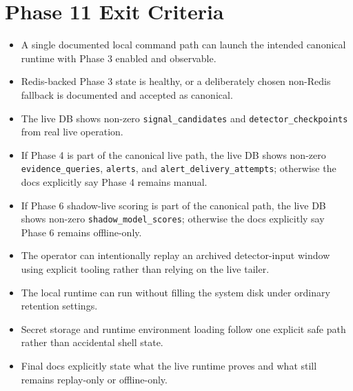\documentclass{article}
\begin{document}
\section*{Phase 11 Exit Criteria}
\begin{itemize}
\item A single documented local command path can launch the intended canonical runtime with Phase 3 enabled and observable.
\item Redis-backed Phase 3 state is healthy, or a deliberately chosen non-Redis fallback is documented and accepted as canonical.
\item The live DB shows non-zero \texttt{signal\_candidates} and \texttt{detector\_checkpoints} from real live operation.
\item If Phase 4 is part of the canonical live path, the live DB shows non-zero \texttt{evidence\_queries}, \texttt{alerts}, and \texttt{alert\_delivery\_attempts}; otherwise the docs explicitly say Phase 4 remains manual.
\item If Phase 6 shadow-live scoring is part of the canonical path, the live DB shows non-zero \texttt{shadow\_model\_scores}; otherwise the docs explicitly say Phase 6 remains offline-only.
\item The operator can intentionally replay an archived detector-input window using explicit tooling rather than relying on the live tailer.
\item The local runtime can run without filling the system disk under ordinary retention settings.
\item Secret storage and runtime environment loading follow one explicit safe path rather than accidental shell state.
\item Final docs explicitly state what the live runtime proves and what still remains replay-only or offline-only.
\end{itemize}
\end{document}
